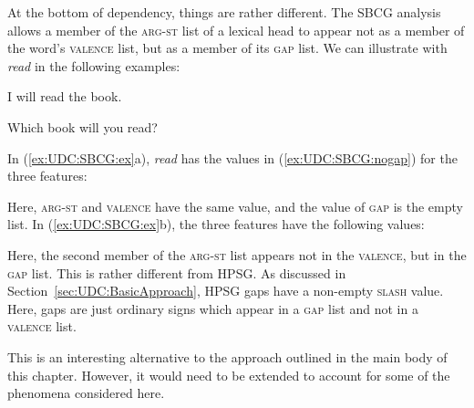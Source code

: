 \documentclass[output=paper
,notxmath 
 	        ,biblatex
                ,babelshorthands
                ,newtxmath
                ,draftmode
                ,colorlinks, citecolor=brown
]{langscibook}
\begin{document}
At the bottom of dependency, things are rather different. The SBCG
analysis allows a member of the \textsc{arg-st} list of a lexical head
to appear not as a member of the word’s \textsc{valence} list, but as
a member of its \textsc{gap} list. We can illustrate with
\textit{read} in the following examples:

\begin{exe}
  \ex \label{ex:UDC:SBCG:ex}
  \begin{xlist}
    \ex I will read the book.
    
    \ex Which book will you read?
  \end{xlist}

\end{exe}

\noindent
In (\ref{ex:UDC:SBCG:ex}a), \textit{read} has the values in
(\ref{ex:UDC:SBCG:nogap}) for the three features:

\begin{exe}
  \ex \label{ex:UDC:SBCG:nogap}

\end{exe}

\noindent
Here, \textsc{arg-st} and \textsc{valence} have the same value, and
the value of \textsc{gap} is the empty list. In
(\ref{ex:UDC:SBCG:ex}b), the three features have the following values:

\begin{exe}
  \ex \label{ex:UDC:SBCG:gap}

\end{exe}
	
\noindent
Here, the second member of the \textsc{arg-st} list appears not in the
\textsc{valence}, but in the \textsc{gap} list. This is rather
different from HPSG. As discussed in
Section~\ref{sec:UDC:BasicApproach}, HPSG gaps have a non-empty
\textsc{slash} value. Here, gaps are just ordinary signs which appear
in a \textsc{gap} list and not in a \textsc{valence} list.

This is an interesting alternative to the approach outlined in the
main body of this chapter. However, it would need to be extended to
account for some of the phenomena considered here.
\end{document}
